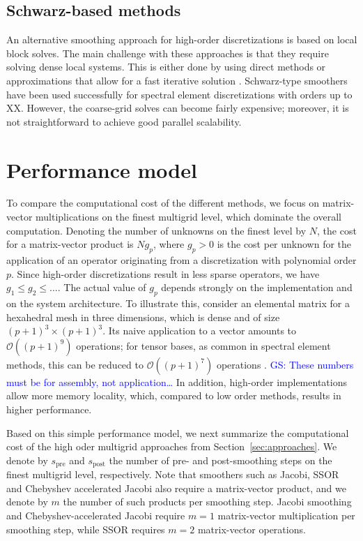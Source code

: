 \documentclass[smallcondensed,final]{svjour3}     %
\newcommand{\gsnote}[1]{\textcolor{blue}{GS: #1}}
\begin{document}
\subsection{Schwarz-based methods}\label{subsec:schwarz}
An alternative smoothing approach for high-order discretizations is
based on local block solves.  The main challenge with these approaches
is that they require solving dense local systems.  This is either done
by using direct methods or approximations that allow for a fast
iterative solution
\cite{LottesFischer05,FischerLottes05}. Schwarz-type smoothers have
been used successfully for spectral element discretizations with
orders up to XX. However, the coarse-grid solves can become fairly
expensive; moreover, it is not straightforward to achieve good
parallel scalability.




\section{Performance model}
To compare the computational cost of the different methods, we focus
on matrix-vector multiplications on the finest multigrid level, which
dominate the overall computation. Denoting the number of unknowns on
the finest level by $N$, the cost for a matrix-vector product is
$Ng_p$, where $g_p>0$ is the cost per unknown for the application of
an operator originating from a discretization with polynomial order
$p$. Since high-order discretizations result in less sparse operators,
we have $g_1\le g_2\le \ldots$. The actual value of $g_p$ depends
strongly on the implementation and on the system architecture. To
illustrate this, consider an elemental matrix for a hexahedral mesh in
three dimensions, which is dense and of size $(p+1)^3\times
(p+1)^3$. Its naive application to a vector amounts to $\mathcal
O((p+1)^9)$ operations; for tensor bases, as common in spectral
element methods, this can be reduced to $\mathcal O((p+1)^7)$
operations \cite{DevilleFischerMund02}. \gsnote{These numbers must be
  for assembly, not application\ldots} In addition, high-order
implementations allow more memory locality, which, compared to low
order methods, results in higher performance.

Based on this simple performance model, we next summarize the
computational cost of the high oder multigrid approaches from
Section~\ref{sec:approaches}. We denote by $s_\text{pre}$ and
$s_\text{post}$ the number of pre- and post-smoothing steps on the
finest multigrid level, respectively. Note that smoothers such as
Jacobi, SSOR and Chebyshev accelerated Jacobi also require a
matrix-vector product, and we denote by $m$ the number of such
products per smoothing step.  Jacobi smoothing and
Chebyshev-accelerated Jacobi require $m=1$ matrix-vector
multiplication per smoothing step, while SSOR requires $m=2$
matrix-vector operations.
\end{document}
